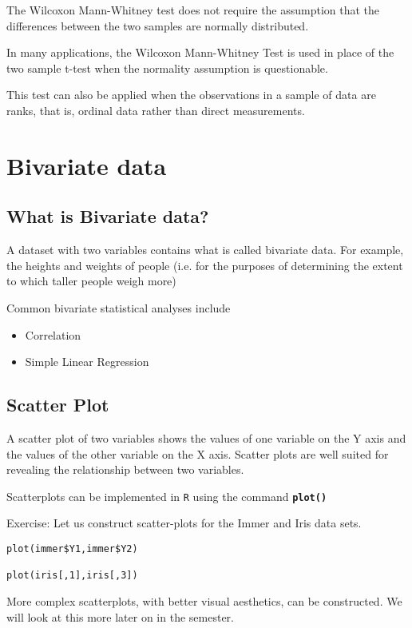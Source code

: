 \documentclass[a4paper,12pt]{article}
\begin{document}
The Wilcoxon Mann-Whitney test does not require the assumption that the differences between the two samples are normally distributed.

In many applications, the Wilcoxon Mann-Whitney Test is used in place of the two sample t-test when the normality assumption is questionable.

This test can also be applied when the observations in a sample of data are ranks, that is, ordinal data rather than direct measurements.

\newpage
\section{Bivariate data}
\subsection{What is Bivariate data?}

A dataset with two variables contains what is called bivariate data. For example, the heights and weights of people (i.e. for the purposes of determining the extent to which taller people weigh more)

Common bivariate statistical analyses include
\begin{itemize}
\item Correlation
\item Simple Linear Regression
\end{itemize}

\subsection{Scatter Plot} A scatter plot of two variables shows the values of one variable on the Y axis and the values of the other variable on the X axis. Scatter plots are well suited for revealing the relationship between two variables.

Scatterplots can be implemented in \texttt{R} using the command \texttt{\textbf{plot()}}

Exercise: Let us construct scatter-plots for the Immer and Iris data sets.

\begin{framed}
\begin{verbatim}
plot(immer$Y1,immer$Y2)

plot(iris[,1],iris[,3])
\end{verbatim}
\end{framed}
More complex scatterplots, with better visual aesthetics, can be constructed. We will look at this more later on in the semester.
\end{document}
